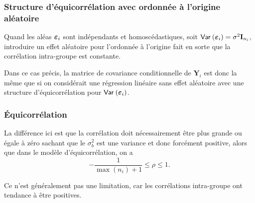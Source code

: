 \documentclass{beamer}
\begin{document}
\begin{frame}[fragile]
\frametitle{Structure d'équicorrélation avec ordonnée à l'origine aléatoire}
Quand les aléas $\boldsymbol {\varepsilon}_i$ sont indépendants et homoscédastiques, soit ${\mathsf{Var}_{}}\left(\boldsymbol {\varepsilon}_i\right)=\sigma^2\mathbf{I}_{n_i}$, introduire un effet aléatoire pour l'ordonnée à l'origine fait en sorte que la corrélation intra-groupe est constante.

\vp\vp\vp\vp
Dans ce cas précis, la matrice de covariance conditionnelle de  $\boldsymbol{Y}_i$ est donc la même que si
on considérait une régression linéaire sans effet aléatoire avec une structure d'équicorrélation pour  ${\mathsf{Var}_{}}\left(\boldsymbol {\varepsilon}_i\right)$.


\end{frame}
\begin{frame}
\frametitle{Équicorrélation}
\bi 
\item La différence ici est que la corrélation doit nécessairement être
plus grande ou égale à zéro sachant que le $\sigma^2_b$ est une variance et donc forcément positive, alors que dans le  modèle d'équicorrélation, on a
\[-\frac{1}{\max(n_i)+1} \leq \rho \leq 1.\]
\item Ce n'est généralement pas une limitation, car les corrélations intra-groupe ont tendance à être positives.

\ei
\end{frame}
\end{document}
